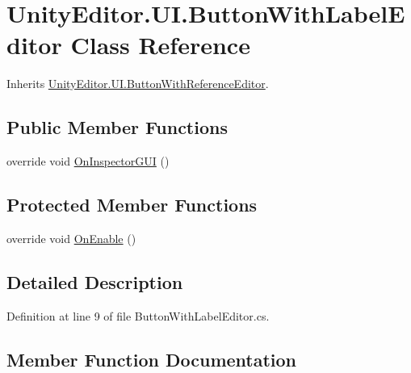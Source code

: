 \hypertarget{class_unity_editor_1_1_u_i_1_1_button_with_label_editor}{}\section{Unity\+Editor.\+U\+I.\+Button\+With\+Label\+Editor Class Reference}
\label{class_unity_editor_1_1_u_i_1_1_button_with_label_editor}


Inherits \hyperlink{class_unity_editor_1_1_u_i_1_1_button_with_reference_editor}{Unity\+Editor.\+U\+I.\+Button\+With\+Reference\+Editor}.

\subsection*{Public Member Functions}
\begin{DoxyCompactItemize}
\item 
override void \hyperlink{class_unity_editor_1_1_u_i_1_1_button_with_label_editor_a10e14df00fd6972751fb41f29b5242ff}{On\+Inspector\+G\+U\+I} ()
\end{DoxyCompactItemize}
\subsection*{Protected Member Functions}
\begin{DoxyCompactItemize}
\item 
override void \hyperlink{class_unity_editor_1_1_u_i_1_1_button_with_label_editor_aaef751673d0f28d5a677664e5be68810}{On\+Enable} ()
\end{DoxyCompactItemize}


\subsection{Detailed Description}


Definition at line 9 of file Button\+With\+Label\+Editor.\+cs.



\subsection{Member Function Documentation}
\hypertarget{class_unity_editor_1_1_u_i_1_1_button_with_label_editor_aaef751673d0f28d5a677664e5be68810}{}
